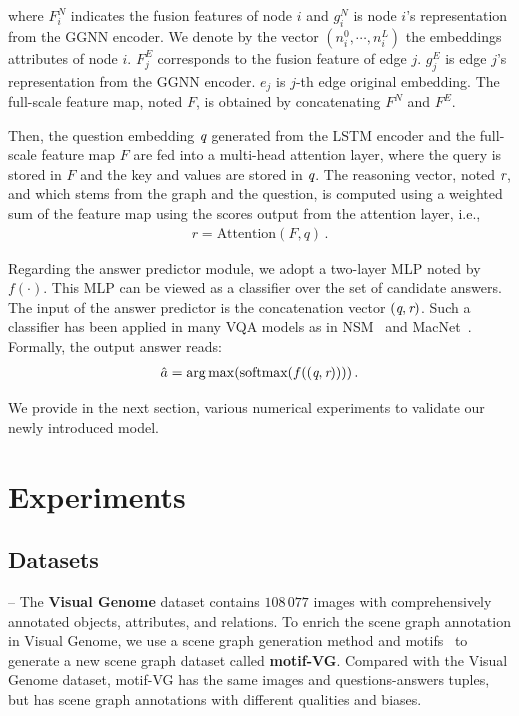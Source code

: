 \documentclass[letterpaper]{article} %
\begin{document}
where $F_i^N$ indicates the fusion features of node $i$ and $g_i^N$ is node $i$'s representation from the GGNN encoder. 
We denote by the vector $(n_i^0, \cdots,n_i^L)$ the embeddings attributes of node $i$. 
$F_j^E$ corresponds to the fusion feature of edge $j$. $g_j^E$ is edge $j$'s representation from the GGNN encoder. 
$e_j$ is $j$-th edge original embedding. 
The full-scale feature map, noted $F$, is obtained by concatenating $F^N$ and $F^E$.

Then, the question embedding $\emph{q}$ generated from the LSTM encoder and the full-scale feature map $F$ are fed into a multi-head attention layer, where the query is stored in $F$ and the key and values are stored in $\emph{q}$.
The reasoning vector, noted $\emph{r}$, and which stems from the graph and the question, is computed using a weighted sum of the feature map using the scores output from the attention layer, i.e.,
\begin{gather}
    r = \text{Attention}(F, q) \, . 
\end{gather}

Regarding the answer predictor module, we adopt a two-layer MLP noted by $f(\cdot)$. 
This MLP can be viewed as a classifier over the set of candidate answers. 
The input of the answer predictor is the concatenation vector $(\emph{q},\emph{r})$. 
Such a classifier has been applied in many VQA models as in NSM~\cite{DBLP:conf/nips/HudsonM19} and MacNet~\cite{DBLP:conf/nips/LuYBP16}.
Formally, the output answer reads:
\begin{gather}
    \hat{a} = \mathop{\arg\max}(\text{softmax}(f((\emph{q},\emph{r}))))\, .
\end{gather}

We provide in the next section, various numerical experiments to validate our newly introduced model.


\section{Experiments}\label{sec:experiments}

\subsection{Datasets}

-- The \textbf{Visual Genome} dataset contains $108 \, 077$ images with comprehensively annotated objects, attributes, and relations. To enrich the scene graph annotation in Visual Genome, we use a scene graph generation method and motifs~\cite{DBLP:conf/cvpr/ZellersYTC18} to generate a new scene graph dataset called \textbf{motif-VG}. 
Compared with the Visual Genome dataset, motif-VG has the same images and questions-answers tuples, but has scene graph annotations with different qualities and biases. 
\end{document}
